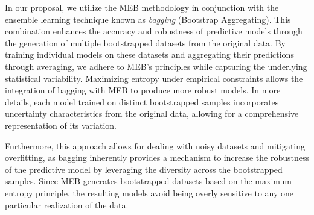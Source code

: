 \documentclass[ijoc,sglanonrev]{informs4}
\begin{document}
In our proposal, we utilize the MEB methodology in conjunction with the ensemble learning technique known as {\it bagging} (Bootstrap Aggregating). This combination enhances the accuracy and robustness of predictive models through the generation of multiple bootstrapped datasets from the original data. By training individual models on these datasets and aggregating their predictions through averaging, we adhere to MEB's principles while capturing the underlying statistical variability. Maximizing entropy under empirical constraints allows the integration of bagging with MEB to produce more robust models. In more details, each model trained on distinct bootstrapped samples incorporates uncertainty characteristics from the original data, allowing for a comprehensive representation of its variation.

Furthermore, this approach allows for dealing with noisy datasets and mitigating overfitting, as bagging inherently provides a mechanism to increase the robustness of the predictive model by leveraging the diversity across the bootstrapped samples. Since MEB generates bootstrapped datasets based on the maximum entropy principle, the resulting models avoid being overly sensitive to any one particular realization of the data.

\end{document}
